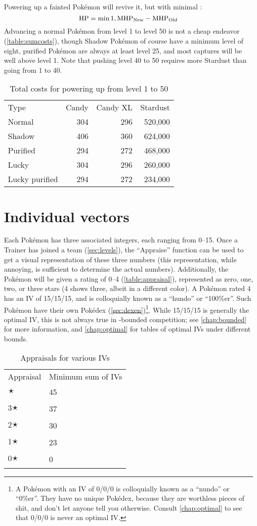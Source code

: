 Powering up a fainted Pokémon will revive it, but with minimal \HP\@:
\[ \mbox{HP} = \min{1, \mbox{MHP}_\mathrm{New} - \mbox{MHP}_\mathrm{Old} } \]
Advancing a normal Pokémon from level 1 to level 50 is not a cheap endeavor (\autoref{table:sumcosts}),
  though Shadow Pokémon of course have a minimum level of eight, purified Pokémon are always
  at least level 25, and most captures will be well above level 1.
Note that pushing level 40 to 50 requires more Stardust than going from 1 to 40.
\begin{table}[ht]
\centering
\begin{tabular}{lrrr}
  Type & Candy & Candy XL & Stardust\\
\Midrule
        Normal & 304 & 296 & 520,000\\
        Shadow & 406 & 360 & 624,000\\
      Purified & 294 & 272 & 468,000\\
         Lucky & 304 & 296 & 260,000\\
Lucky purified & 294 & 272 & 234,000\\
\end{tabular}
\caption{Total costs for powering up from level 1 to 50\label{table:sumcosts}}
\end{table}

\section{Individual vectors\label{sec:ivs}}
Each Pokémon has three associated integers, each ranging from 0--15.
Once a Trainer has joined a team (\autoref{sec:levels}), the ``Appraise'' function can be used to
  get a visual representation of these three numbers (this representation,
  while annoying, is sufficient to determine the actual numbers).
Additionally, the Pokémon will be given a rating of 0--4 (\autoref{table:appraisal}), represented as
  zero, one, two, or three stars (4 shows three, albeit in a different color).
A Pokémon rated 4 has an IV of 15/15/15, and is colloquially known as a ``hundo'' or ``100\%er''.
Such Pokémon have their own Pokédex (\autoref{sec:dexen})\footnote{A Pokémon with an IV of 0/0/0
 is colloquially known as a ``nundo'' or ``0\%er''. They have no unique Pokédex, because they are worthless pieces of shit,
  and don't let anyone tell you otherwise. Consult \autoref{chap:optimal} to see that 0/0/0 is never an optimal IV.}.
While 15/15/15 is generally the optimal IV, this is not always true in \CP-bounded
  competition; see \autoref{chap:bounded} for more information,
  and \autoref{chap:optimal} for tables of optimal IVs under different \CP{} bounds.
\begin{table}
\centering
\begin{tabular}{ll}
Appraisal & Minimum sum of IVs\\
\Midrule
4🟉 & 45\\
3🟉 & 37\\
2🟉 & 30\\
1🟉 & 23\\
0🟉 & 0\\
\end{tabular}
\caption{Appraisals for various IVs\label{table:appraisal}}
\end{table}

